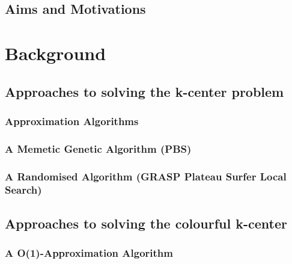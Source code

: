 \documentclass{article}
\begin{document}
    \subsection{Aims and Motivations}
    

\newpage
\section{Background}\label{section:background}
    \subsection{Approaches to solving the k-center problem}\label{subsection:approaches_k_center}
    

        \subsubsection{Approximation Algorithms}\label{section:greedy}
        
        
        \subsubsection{A Memetic Genetic Algorithm (PBS)}\label{section:pbs}
        
        
        \subsubsection{A Randomised Algorithm (GRASP Plateau Surfer Local Search)}\label{section:plateau_surfer}
        

    \subsection{Approaches to solving the colourful k-center}\label{subsection:approaches_colourful_k_center}
    

        \subsubsection{A O(1)-Approximation Algorithm}\label{section:constant_colourful_k_center}
        
        
        \newpage
\end{document}
